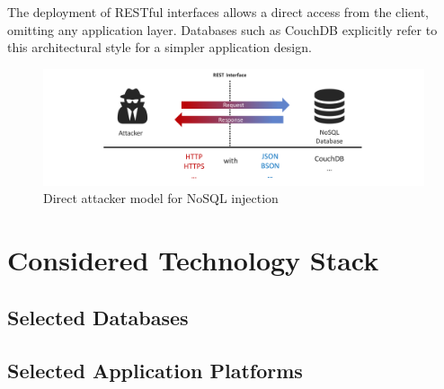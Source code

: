 The deployment of RESTful interfaces allows a direct access from the client, omitting any application layer. Databases such as CouchDB explicitly refer to this architectural style for a simpler application design.

\begin{figure}[h]
\centering
  \includegraphics[width=1\linewidth]{Images/attacker_model_direct}
  \caption{Direct attacker model for NoSQL injection}
  \label{fig:extendedAttackerModel}
\end{figure}



\section{Considered Technology Stack}
\subsection{Selected Databases}
\subsection{Selected Application Platforms}